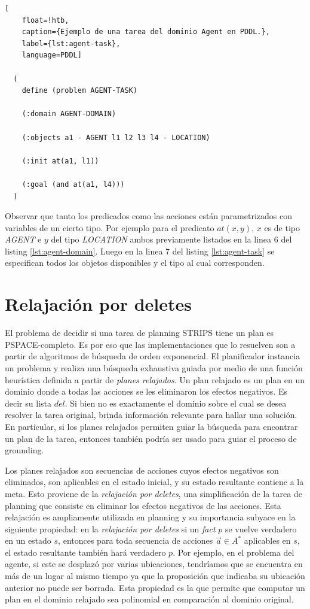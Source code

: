 \begin{lstlisting}[
    float=!htb,
    caption={Ejemplo de una tarea del dominio Agent en PDDL.},
    label={lst:agent-task},
    language=PDDL]

  (
    define (problem AGENT-TASK)

    (:domain AGENT-DOMAIN)

    (:objects a1 - AGENT l1 l2 l3 l4 - LOCATION)

    (:init at(a1, l1))
    
    (:goal (and at(a1, l4)))
  )
\end{lstlisting}

Observar que tanto los predicados como las acciones están parametrizados con variables de un cierto
tipo. Por ejemplo para el predicato $at(x, y)$, $x$ es de tipo \emph{AGENT} e $y$ del tipo \emph{LOCATION} ambos previamente listados en la linea 6 del listing \ref{lst:agent-domain}. Luego en la linea 7 del listing \ref{lst:agent-task} se especifican todos los objetos disponibles y el tipo al cual corresponden.

\section{Relajación por deletes}

El problema de decidir si una tarea de planning STRIPS tiene un plan es
PSPACE-completo. Es por eso que las implementaciones que lo resuelven son a partir de algoritmos de búsqueda de orden exponencial. El planificador instancia un problema y realiza una búsqueda exhaustiva guiada por medio de una función heurística definida a partir de \emph{planes relajados}. Un plan relajado es un plan en un dominio donde a todas las acciones se les eliminaron los efectos negativos. Es decir su lista $del$. Si bien no es exactamente el dominio sobre el cual se desea resolver la tarea original, brinda información relevante para hallar una solución. En particular, si los planes relajados permiten guiar la búsqueda para encontrar un plan de la tarea, entonces también podría ser usado para guiar el proceso de grounding.

Los planes relajados son secuencias de acciones cuyos efectos negativos son eliminados, son aplicables en el estado inicial, y su estado resultante contiene a la meta. Esto proviene de la \emph{relajación por deletes}, una simplificación de la tarea de planning que consiste en
eliminar los efectos negativos de las acciones. Esta
relajación es ampliamente utilizada en planning y su importancia subyace en la
siguiente propiedad: en la \emph{relajación por deletes} si un \emph{fact} $p$ se
vuelve verdadero en un estado $s$, entonces para toda secuencia de acciones $\vec{a} \in A^{*}$ aplicables en $s$, el estado resultante también hará verdadero $p$. Por ejemplo, en el
problema del agente, si este se desplazó por varias ubicaciones, tendríamos que
se encuentra en más de un lugar al mismo tiempo ya que la proposición que
indicaba su ubicación anterior no puede ser borrada. Esta propiedad es la que permite que computar un plan en el dominio relajado sea polinomial en comparación al dominio original.

